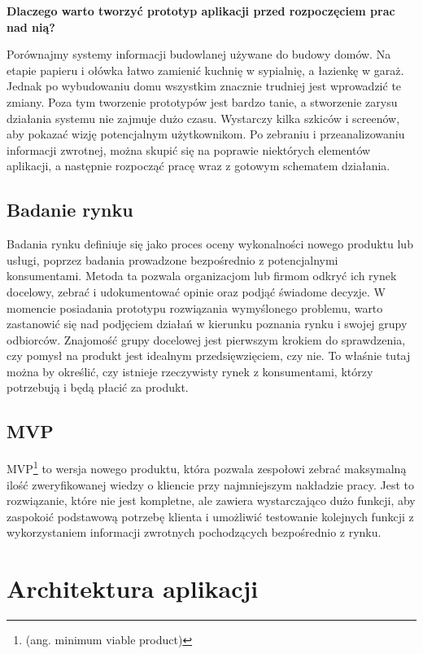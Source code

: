 \textbf{Dlaczego warto tworzyć prototyp aplikacji przed rozpoczęciem prac nad nią?}

Porównajmy systemy informacji budowlanej używane do budowy domów. Na etapie papieru i ołówka łatwo zamienić kuchnię w sypialnię, a łazienkę w garaż. Jednak po wybudowaniu domu wszystkim znacznie trudniej jest wprowadzić te zmiany. Poza tym tworzenie prototypów jest bardzo tanie, a stworzenie zarysu działania systemu nie zajmuje dużo czasu. Wystarczy kilka szkiców i screenów, aby pokazać wizję potencjalnym użytkownikom. Po zebraniu i przeanalizowaniu informacji zwrotnej, można skupić się na poprawie niektórych elementów aplikacji, a następnie rozpocząć pracę wraz z gotowym schematem działania.

\subsection{Badanie rynku}

Badania rynku definiuje się jako proces oceny wykonalności nowego produktu lub usługi, poprzez badania prowadzone bezpośrednio z potencjalnymi konsumentami. Metoda ta pozwala organizacjom lub firmom odkryć ich rynek docelowy, zebrać i udokumentować opinie oraz podjąć świadome decyzje.
W momencie posiadania prototypu rozwiązania wymyślonego problemu, warto zastanowić się nad podjęciem działań w kierunku poznania rynku i swojej grupy odbiorców.
Znajomość grupy docelowej jest pierwszym krokiem do sprawdzenia, czy pomysł na produkt jest idealnym przedsięwzięciem, czy nie. To właśnie tutaj można by określić, czy istnieje rzeczywisty rynek z konsumentami, którzy potrzebują i będą płacić za produkt.

\subsection{MVP}

MVP\footnote{(ang. minimum viable product)} to wersja nowego produktu, która pozwala zespołowi zebrać maksymalną ilość zweryfikowanej wiedzy o kliencie przy najmniejszym nakładzie pracy. Jest to rozwiązanie, które nie jest kompletne, ale zawiera wystarczająco dużo funkcji, aby zaspokoić podstawową potrzebę klienta i umożliwić testowanie kolejnych funkcji z wykorzystaniem informacji zwrotnych pochodzących bezpośrednio z rynku.


\section{Architektura aplikacji}

